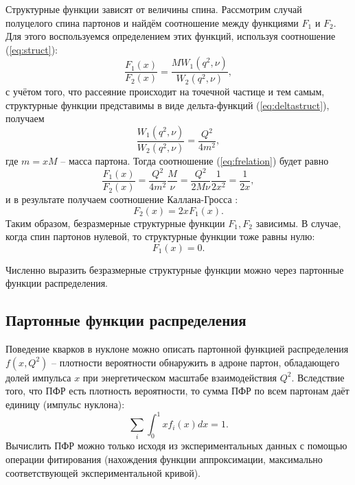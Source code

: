 \documentclass{extarticle}
\begin{document}
Структурные функции зависят от величины спина. Рассмотрим случай полуцелого спина партонов и найдём соотношение между функциями $F_1$ и $F_2$. Для этого воспользуемся определением этих функций, используя соотношение (\ref{eq:struct}):
\begin{equation}
	\frac{F_1(x)}{F_2(x)} = \frac{MW_1(q^2, \nu)}{W_2(q^2, \nu)},
	\label{eq:frelation}
\end{equation}
с учётом того, что рассеяние происходит на точечной частице и тем самым, структурные функции представимы в виде дельта-функций (\ref{eq:deltastruct}), получаем
\begin{equation}
	\frac{W_1(q^2, \nu)}{W_2(q^2, \nu)} = \frac{Q^2}{4m^2},
\end{equation}
где $m = xM$ -- масса партона. Тогда соотношение (\ref{eq:frelation}) будет равно
\begin{equation}
	\frac{F_1(x)}{F_2(x)} =  \frac{Q^2}{4m^2} \frac{M}{\nu} =  \frac{Q^2}{2M\nu} \frac{1}{2x^2} = \frac{1}{2x},
\end{equation}
и в результате получаем соотношение Каллана-Гросса \cite{Callan-Gross}:
\begin{equation}
		F_2(x) = 2xF_1(x).
\end{equation}
Таким образом, безразмерные структурные функции $F_1, F_2$ зависимы. В случае, когда спин партонов нулевой, то структурные функции тоже равны нулю:
\begin{equation}
	F_1 (x) = 0.
\end{equation}

Численно выразить безразмерные структурные функции можно через партонные функции распределения.

\subsection{Партонные функции распределения}
Поведение кварков в нуклоне можно описать партонной функцией распределения $f(x,Q^2)$ – плотности вероятности обнаружить в адроне партон, обладающего долей импульса $x$ при энергетическом масштабе взаимодействия $Q^2$. Вследствие того, что ПФР есть плотность вероятности, то сумма ПФР по всем партонам даёт единицу (импульс нуклона):
\begin{equation}
	\sum_i \int_0^1 x f_i(x)dx = 1.
\end{equation}
Вычислить ПФР можно только исходя из экспериментальных данных с помощью операции фитирования (нахождения функции аппроксимации, максимально соответствующей экспериментальной кривой). 
\end{document}
